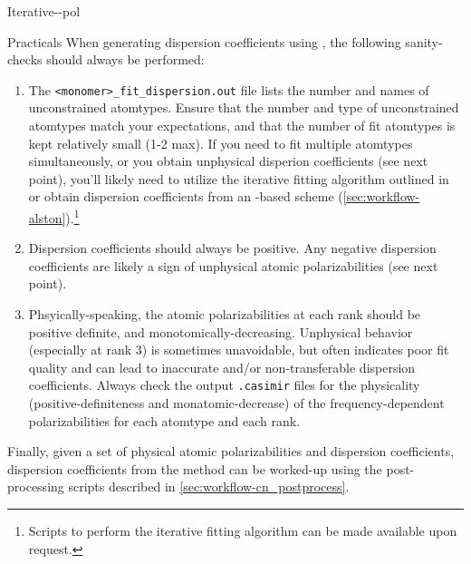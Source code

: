 \begin{subsubsection}{Iterative-\dma-pol}
\begin{paragraph}{Practicals}
When generating dispersion coefficients using \idma, the following sanity-checks should
always be performed:
\begin{enumerate}
\item The \verb|<monomer>_fit_dispersion.out| file lists the number and names of
unconstrained atomtypes. Ensure that the number and type of unconstrained atomtypes match your
expectations, and that the number of fit atomtypes is kept relatively small
(1-2 max). If you need to fit multiple atomtypes simultaneously, or you obtain
unphysical disperion coefficients (see next point), you'll likely need to
utilize the iterative fitting algorithm outlined in 
 or obtain dispersion coefficients from an \isa-based
scheme (\cref{sec:workflow-alston}).\footnote{Scripts to perform the iterative
\idma fitting algorithm can be made available upon request.}
%
\item Dispersion coefficients should always be positive. Any negative
dispersion coefficients are likely a sign of unphysical atomic
polarizabilities (see next point).
%
\item Phsyically-speaking, the atomic polarizabilities at each rank should be positive
definite, and monotomically-decreasing.\cite{Williams2003,stone2013theory} Unphysical behavior (especially at
rank 3) is sometimes unavoidable, but often indicates poor fit quality and can
lead to inaccurate and/or non-transferable dispersion coefficients. Always
check the output \verb|.casimir| files for the physicality
(positive-definiteness and monatomic-decrease) of the frequency-dependent
polarizabilities for each atomtype and each rank.
%
\end{enumerate}

Finally, given a set of physical atomic polarizabilities and dispersion
coefficients, dispersion coefficients from the \idma method can be worked-up
using the post-processing scripts described in
\cref{sec:workflow-cn_postprocess}.
\end{paragraph}
\end{subsubsection}







